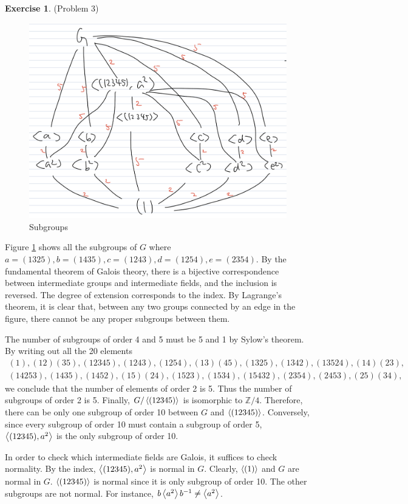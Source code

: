 \documentclass[12pt, psamsfonts]{amsart}
\theoremstyle{definition}
\newtheorem*{exer}{Exercise}
\theoremstyle{remark}
\numberwithin{equation}{section}
\begin{document}
\begin{exer}{(Problem 3)}
  \begin{figure}
    \includegraphics[width=.5\linewidth]{subgroups.jpeg}
    \caption{Subgroups}
    \label{fig:subgroups}
  \end{figure}
  Figure \ref{fig:subgroups} shows all the subgroups of $G$ where $a = (1325), b = (1435), c = (1243), d = (1254), e = (2354)$.
  By the fundamental theorem of Galois theory, there is a bijective correspondence between intermediate groups and intermediate fields, and the inclusion is reversed.
  The degree of extension corresponds to the index.
  By Lagrange's theorem, it is clear that, between any two groups connected by an edge in the figure, there cannot be any proper subgroups between them.

  The number of subgroups of order 4 and 5 must be 5 and 1 by Sylow's theorem.
  By writing out all the 20 elements
  \begin{align*}
    (1),(12)(35),(12345),(1243),(1254),(13)(45),(1325),(1342),(13524),(14)(23), \\
    (14253),(1435),(1452),(15)(24),(1523),(1534),(15432),(2354),(2453),(25)(34),
  \end{align*}
  we conclude that the number of elements of order 2 is 5.
  Thus the number of subgroups of order 2 is 5.
  Finally, $G / \ev{(12345)}$ is isomorphic to $\mathbb{Z}/4$.
  Therefore, there can be only one subgroup of order 10 between $G$ and $\ev{(12345)}$.
  Conversely, since every subgroup of order 10 must contain a subgroup of order 5, $\ev{(12345), a^2}$ is the only subgroup of order 10.

  In order to check which intermediate fields are Galois, it suffices to check normality.
  By the index, $\ev{(12345), a^2}$ is normal in $G$.
  Clearly, $\ev{(1)}$ and $G$ are normal in $G$.
  $\ev{(12345)}$ is normal since it is only subgroup of order 10.
  The other subgroups are not normal.
  For instance, $b\ev{a^2}b^{-1} \ne \ev{a^2}$.
\end{exer}
\end{document}
